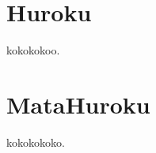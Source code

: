 \documentclass[12pt,dvipdfmx]{report}
\begin{document}
\renewcommand{\thesection}{\Alph{section}}
\appendix
{}
\chapter{Huroku}

kokokokoo.

\chapter{MataHuroku}

kokokokoko.

%
\end{document}
